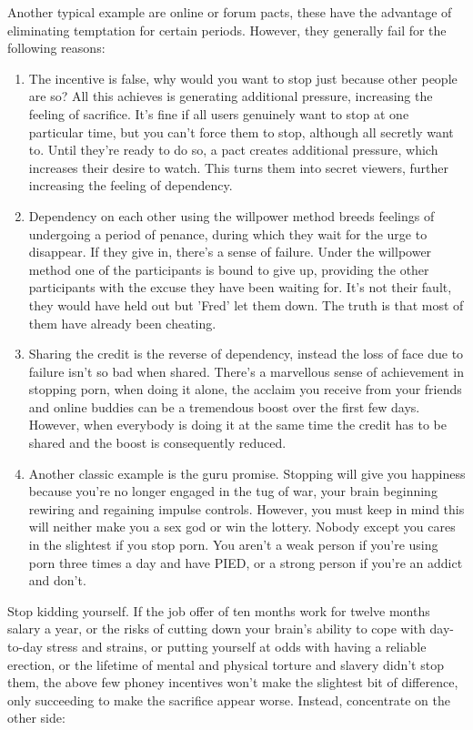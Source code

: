 \documentclass[easypeasy.tex]{subfiles}
\begin{document}
Another typical example are online or forum pacts, these have the advantage of eliminating temptation for certain periods. However, they generally fail for the following reasons:
\begin{enumerate}
  \item The incentive is false, why would you want to stop just because other people are so? All this achieves is generating additional pressure, increasing the feeling of sacrifice. It's fine if all users genuinely want to stop at one particular time, but you can't force them to stop, although all secretly want to. Until they're ready to do so, a pact creates additional pressure, which increases their desire to watch. This turns them into secret viewers, further increasing the feeling of dependency.

  \item Dependency on each other using the willpower method breeds feelings of undergoing a period of penance, during which they wait for the urge to disappear. If they give in, there's a sense of failure. Under the willpower method one of the participants is bound to give up, providing the other participants with the excuse they have been waiting for. It's not their fault, they would have held out but 'Fred' let them down. The truth is that most of them have already been cheating.

  \item Sharing the credit is the reverse of dependency, instead the loss of face due to failure isn't so bad when shared. There's a marvellous sense of achievement in stopping porn, when doing it alone, the acclaim you receive from your friends and online buddies can be a tremendous boost over the first few days. However, when everybody is doing it at the same time the credit has to be shared and the boost is consequently reduced.

  \item Another classic example is the guru promise. Stopping will give you happiness because you're no longer engaged in the tug of war, your brain beginning rewiring and regaining impulse controls. However, you must keep in mind this will neither make you a sex god or win the lottery. Nobody except you cares in the slightest if you stop porn. You aren't a weak person if you're using porn three times a day and have PIED, or a strong person if you're an addict and don't.
\end{enumerate}

Stop kidding yourself. If the job offer of ten months work for twelve months salary a year, or the risks of cutting down your brain's ability to cope with day-to-day stress and strains, or putting yourself at odds with having a reliable erection, or the lifetime of mental and physical torture and slavery didn't stop them, the above few phoney incentives won't make the slightest bit of difference, only succeeding to make the sacrifice appear worse. Instead, concentrate on the other side:
  
\end{document}
